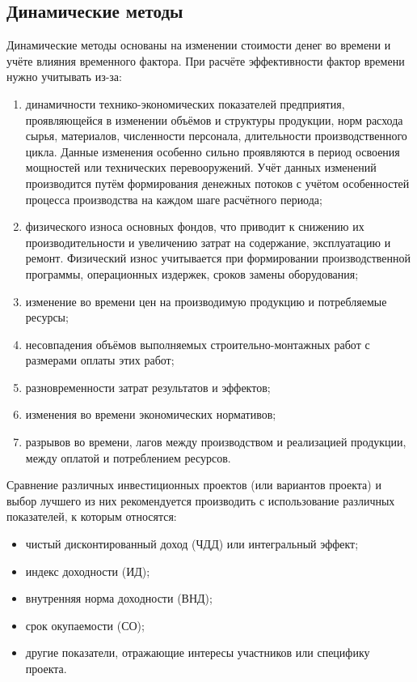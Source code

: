 \documentclass[a4paper,12pt]{article}
\begin{document}
\subsection{Динамические методы}
Динамические методы основаны на изменении стоимости денег во
времени и учёте влияния временного фактора. При расчёте эффективности
фактор времени нужно учитывать из-за:
\begin{enumerate}
\item динамичности технико-экономических показателей предприятия, проявляющейся в изменении объёмов и структуры продукции,
норм расхода сырья, материалов, численности персонала, длительности
производственного цикла. Данные изменения особенно сильно проявляются в период освоения мощностей или технических перевооружений.
Учёт данных изменений производится путём формирования денежных
потоков с учётом особенностей процесса производства на каждом шаге
расчётного периода;
\item физического износа основных фондов, что приводит к снижению их производительности и увеличению затрат на содержание, эксплуатацию и ремонт. Физический износ учитывается при формировании
производственной программы, операционных издержек, сроков замены
оборудования;
\item изменение во времени цен на производимую продукцию и потребляемые ресурсы;
\item несовпадения объёмов выполняемых строительно-монтажных работ с размерами оплаты этих работ;
\item разновременности затрат результатов и эффектов;
\item изменения во времени экономических нормативов;
\item разрывов во времени, лагов между производством и реализацией продукции, между оплатой и потреблением ресурсов.
\end{enumerate}
Сравнение различных инвестиционных проектов (или вариантов
проекта) и выбор лучшего из них рекомендуется производить с использование различных показателей, к которым относятся:
\begin{itemize}

\item чистый дисконтированный доход (ЧДД) или интегральный эффект;
\item индекс доходности (ИД);
\item внутренняя норма доходности (ВНД);
\item срок окупаемости (СО);
\item другие показатели, отражающие интересы участников или специфику проекта.
\end{itemize}
\end{document}
